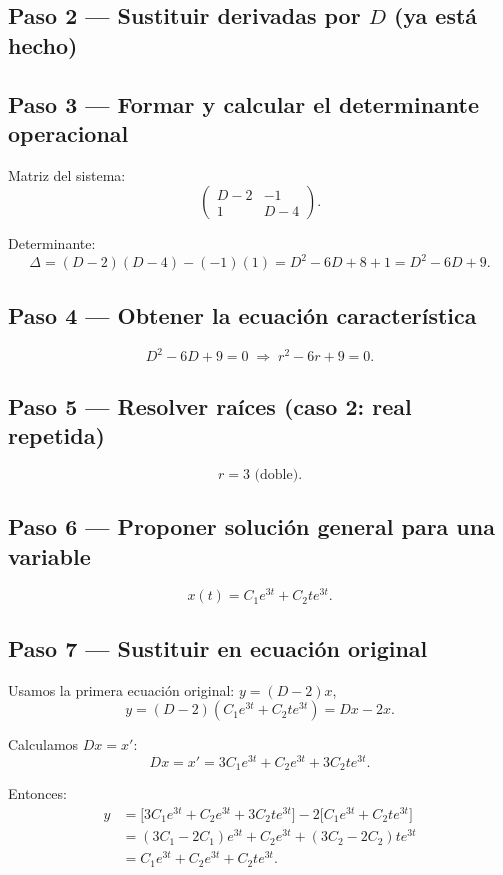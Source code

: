 \documentclass[10pt,a4paper]{article}
\begin{document}
\subsection{Paso 2 --- Sustituir derivadas por \(D\) (ya está hecho)}

\subsection{Paso 3 --- Formar y calcular el determinante operacional}

Matriz del sistema:
\[
\begin{pmatrix}
D - 2 & -1 \\
1     & D - 4
\end{pmatrix}.
\]

Determinante:
\[
\Delta = (D - 2)(D - 4) - (-1)(1) = D^{2} - 6D + 8 + 1 = D^{2} - 6D + 9.
\]

\subsection{Paso 4 --- Obtener la ecuación característica}
\[
D^{2} - 6D + 9 = 0 \;\Longrightarrow\; r^{2} - 6r + 9 = 0.
\]

\subsection{Paso 5 --- Resolver raíces (caso 2: real repetida)}
\[
r = 3 \text{ (doble)}.
\]

\subsection{Paso 6 --- Proponer solución general para una variable}
\[
x(t) = C_{1} e^{3t} + C_{2} t e^{3t}.
\]

\subsection{Paso 7 --- Sustituir en ecuación original}

Usamos la primera ecuación original: \(y = (D - 2)x\),
\[
y = (D - 2)(C_{1} e^{3t} + C_{2} t e^{3t}) = Dx - 2x.
\]

Calculamos \(Dx = x'\):
\[
Dx = x' = 3C_{1} e^{3t} + C_{2} e^{3t} + 3C_{2} t e^{3t}.
\]

Entonces:
\[
\begin{aligned}
y &= \bigl[3C_{1} e^{3t} + C_{2} e^{3t} + 3C_{2} t e^{3t}\bigr]
     - 2\bigl[C_{1} e^{3t} + C_{2} t e^{3t}\bigr] \\[2pt]
  &= (3C_{1} - 2C_{1}) e^{3t} + C_{2} e^{3t} + (3C_{2} - 2C_{2}) t e^{3t} \\[2pt]
  &= C_{1} e^{3t} + C_{2} e^{3t} + C_{2} t e^{3t}.
\end{aligned}
\]
\end{document}
